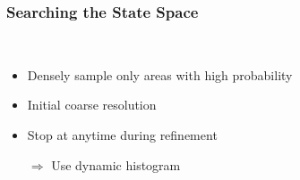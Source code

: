 \begin{frame}
  \frametitle{Searching the State Space}
  \begin{description}[]
  \item[In Real Time] \hfill \\
  \begin{itemize}
  \item Densely sample only areas with high probability
  \item Initial coarse resolution
  \item Stop at anytime during refinement
  \pause
  \item[$\Rightarrow$] Use dynamic histogram
  \end{itemize}
  \end{description}
\end{frame}


